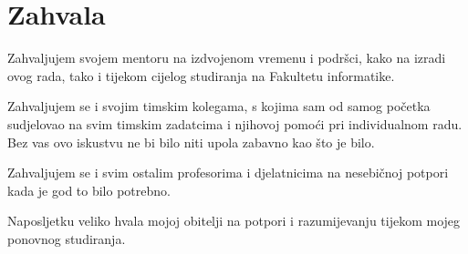 \chapter*{Zahvala}
Zahvaljujem svojem mentoru  na izdvojenom vremenu i podršci, kako na izradi ovog rada, tako i tijekom cijelog studiranja na Fakultetu informatike.

Zahvaljujem se i svojim timskim kolegama, s kojima sam od samog početka sudjelovao na svim timskim zadatcima i njihovoj pomoći pri individualnom radu. Bez vas ovo iskustvu ne bi bilo niti upola zabavno kao što je bilo.

Zahvaljujem se i svim ostalim profesorima i djelatnicima  na nesebičnoj potpori kada je god to bilo potrebno.

Naposljetku veliko hvala mojoj obitelji na potpori i razumijevanju tijekom mojeg ponovnog studiranja.
